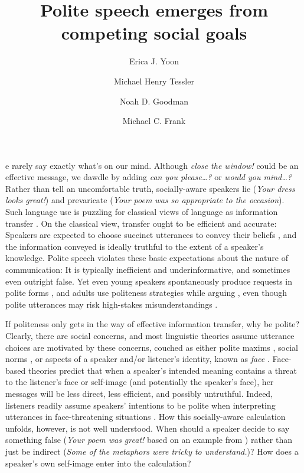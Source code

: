 \documentclass[9pt,twocolumn,twoside,lineno]{main_class_file}
\title{Polite speech emerges from competing social goals}
\author[a,1,2]{Erica J. Yoon}
\author[a,1]{ Michael Henry Tessler}
\author[a]{Noah D. Goodman}
\author[a]{Michael C. Frank}
\affil[a]{Department of Psychology, Stanford University}
\begin{document}
\maketitle
\thispagestyle{firststyle}


e rarely say exactly what's on our mind.
Although \emph{close the window!} could be an effective message, we dawdle by adding \emph{can you please\ldots{}?}
or \emph{would you mind\ldots{}?}
Rather than tell an uncomfortable truth, socially-aware speakers lie (\emph{Your dress looks great!}) and
prevaricate (\emph{Your poem was so appropriate to the occasion}).
Such language use is puzzling for classical views of language as information transfer \cite{buhler1934, frank2012, shannon1948}. On the classical view, transfer ought to be efficient and accurate: Speakers are expected to choose succinct utterances to convey their beliefs \cite{grice1975, searle1975}, and the information conveyed is ideally truthful to the extent of a speaker's knowledge. Polite speech violates these
basic expectations about the nature of communication: It is typically
inefficient and underinformative, and sometimes even outright false. Yet even young speakers spontaneously produce
requests in polite forms \cite{axia1985}, and adults use politeness strategies while arguing \cite{holtgraves1997}, even though polite utterances may risk high-stakes misunderstandings \cite{bonnefon2011risk}. 

If politeness only gets in the way of effective information transfer, why be polite?
Clearly, there are social concerns, and most linguistic theories assume utterance choices are motivated by these concerns, couched as either polite maxims \cite{leech1983}, social norms \cite{ide1989}, or aspects of a speaker and/or listener's identity, known as \emph{face} \cite{brown1987, goffman1967}.
Face-based theories predict that when a speaker's intended meaning contains a threat to the listener's face or self-image (and potentially the speaker's face), her messages will be less direct, less efficient, and possibly untruthful.
Indeed, listeners readily assume speakers' intentions to be polite when interpreting utterances in face-threatening situations \cite{bonnefon2009}.
How this socially-aware calculation unfolds, however, is not well understood.
When should a speaker decide to say something false (\emph{Your poem was great!} based on an example from \cite{bonnefon2009}) rather than just be indirect (\emph{Some of the metaphors were tricky to understand.})?
How does a speaker's own self-image enter into the calculation?
\end{document}
